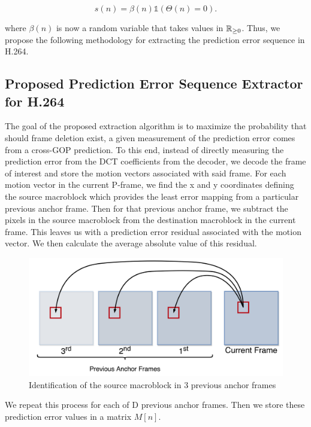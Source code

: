 \begin{equation}
s(n) = \beta(n) \mathds{1} \left( \Theta(n) = 0 \right).
\label{newModel}
\end{equation}

where $\beta(n)$ is now a random variable that takes values in $\operatorname*{\mathbb{R}}_{\geq 0}$. Thus, we propose the following methodology for extracting the prediction error sequence in H.264.

\subsection{Proposed Prediction Error Sequence Extractor for H.264}

The goal of the proposed extraction algorithm is to maximize the probability that should frame deletion exist, a given measurement of the prediction error comes from a cross-GOP prediction. To this end, instead of directly measuring the prediction error from the DCT coefficients from the decoder, we decode the frame of interest and store the motion vectors associated with said frame. For each motion vector in the current P-frame, we find the x and y coordinates defining the source macroblock which provides the least error mapping from a particular previous anchor frame. Then for that previous anchor frame, we subtract the pixels in the source macroblock from the destination macroblock in the current frame. This leaves us with a prediction error residual associated with the motion vector. We then calculate the average absolute value of this residual.

\begin{figure}[htbp]
\centerline{\includegraphics[width=0.9\linewidth]{ProposedApproach/id_source_mb.png}}
\caption{Identification of the source macroblock in 3 previous anchor frames}
\label{srcmbid}
\end{figure}

We repeat this process for each of D previous anchor frames. Then we store these prediction error values in a matrix $M[n]$.

